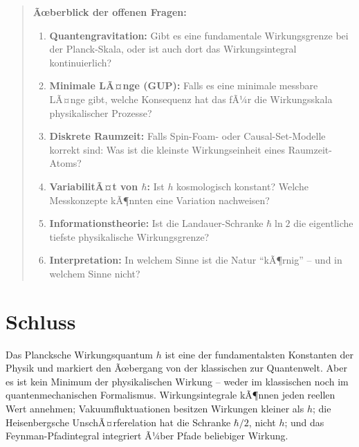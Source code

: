 ﻿\documentclass[12pt,a4paper]{article}
\theoremstyle{plain}
\theoremstyle{definition}
\theoremstyle{remark}
\begin{document}
\begin{quote}
\textbf{Ãœberblick der offenen Fragen:}
\begin{enumerate}[leftmargin=1.5em,label=\arabic*.]
  \item \textbf{Quantengravitation:} Gibt es eine fundamentale Wirkungsgrenze bei der
    Planck-Skala, oder ist auch dort das Wirkungsintegral kontinuierlich?
  \item \textbf{Minimale LÃ¤nge (GUP):} Falls es eine minimale messbare LÃ¤nge gibt,
    welche Konsequenz hat das fÃ¼r die Wirkungsskala physikalischer Prozesse?
  \item \textbf{Diskrete Raumzeit:} Falls Spin-Foam- oder Causal-Set-Modelle korrekt
    sind: Was ist die kleinste Wirkungseinheit eines Raumzeit-Atoms?
  \item \textbf{VariabilitÃ¤t von $\hbar$:} Ist $h$ kosmologisch konstant? Welche
    Messkonzepte kÃ¶nnten eine Variation nachweisen?
  \item \textbf{Informationstheorie:} Ist die Landauer-Schranke $\hbar\ln 2$ die
    eigentliche tiefste physikalische Wirkungsgrenze?
  \item \textbf{Interpretation:} In welchem Sinne ist die Natur ``kÃ¶rnig'' -- und in
    welchem Sinne nicht?
\end{enumerate}
\end{quote}

\section{Schluss}

Das Plancksche Wirkungsquantum $h$ ist eine der fundamentalsten Konstanten der Physik
und markiert den Ãœbergang von der klassischen zur Quantenwelt. Aber es ist kein
Minimum der physikalischen Wirkung -- weder im klassischen noch im quantenmechanischen
Formalismus. Wirkungsintegrale kÃ¶nnen jeden reellen Wert annehmen; Vakuumfluktuationen
besitzen Wirkungen kleiner als $h$; die Heisenbergsche UnschÃ¤rferelation hat die Schranke
$\hbar/2$, nicht $h$; und das Feynman-Pfadintegral integriert Ã¼ber Pfade beliebiger
Wirkung.
\end{document}
